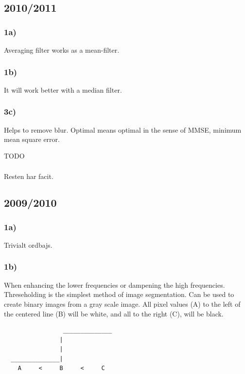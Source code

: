 \documentclass[12pt]{article}
\begin{document}
\subsection{2010/2011}

    \subsubsection*{1a)}
        
        Averaging filter works as a mean-filter.
        
    \subsubsection*{1b)}
        
        It will work better with a median filter.
        
    \subsubsection*{3c)}

        Helps to remove blur. Optimal means optimal in the sense of MMSE, minimum mean square error.
        
        TODO

    \subsubsection*{}
    
        Resten har facit. 
        
\subsection{2009/2010}

    \subsubsection*{1a)}
    
        Trivialt ordbajs.
    
    \subsubsection*{1b)}
    
        When enhancing the lower frequencies or dampening the high frequencies. Threseholding is the simplest
        method of image segmentation. Can be used to create binary images from a gray scale image. 
        All pixel values (A) to the left of the centered line (B) will be white, and all to the right (C), will be black.
        \begin{verbatim}
                 ______________
                |
                |
  ______________|
    A     <     B     <     C
            
        \end{verbatim}
\end{document}
